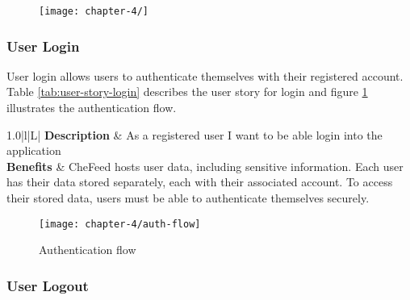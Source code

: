 \begin{figure}
    \texttt{[image: chapter-4/]}
\end{figure}

\subsubsection{User Login}
User login allows users to authenticate themselves with their registered account. Table \ref{tab:user-story-login} describes the user story for login and figure \ref{fig:auth-flow} illustrates the authentication flow.

\begin{table}[!h]
    \centering
    \caption{User story - Login}
    \label{tab:user-story-login}
    \begin{tabulary}{1.0\textwidth}{|l|L|}
        \hline
        \textbf{Description} & As a registered user I want to be able login into the application \\
        \hline
        \textbf{Benefits} & CheFeed hosts user data, including sensitive information. Each user has their data stored separately, each with their associated account. To access their stored data, users must be able to authenticate themselves securely. \\
        \hline
    \end{tabulary}
\end{table}

\begin{figure}[!h]
    \texttt{[image: chapter-4/auth-flow]}
    \caption{Authentication flow}
    \label{fig:auth-flow}
\end{figure}

\subsubsection{User Logout}

